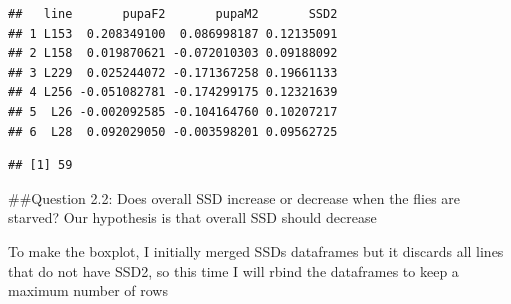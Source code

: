 \documentclass[
]{article}
\newenvironment{Shaded}{\begin{snugshade}}{\end{snugshade}}
\newcommand{\CommentTok}[1]{\textcolor[rgb]{0.56,0.35,0.01}{\textit{#1}}}
\newcommand{\DecValTok}[1]{\textcolor[rgb]{0.00,0.00,0.81}{#1}}
\newcommand{\KeywordTok}[1]{\textcolor[rgb]{0.13,0.29,0.53}{\textbf{#1}}}
\newcommand{\NormalTok}[1]{#1}
\newcommand{\OperatorTok}[1]{\textcolor[rgb]{0.81,0.36,0.00}{\textbf{#1}}}
\newcommand{\StringTok}[1]{\textcolor[rgb]{0.31,0.60,0.02}{#1}}
\begin{document}
\begin{verbatim}
##   line       pupaF2       pupaM2       SSD2
## 1 L153  0.208349100  0.086998187 0.12135091
## 2 L158  0.019870621 -0.072010303 0.09188092
## 3 L229  0.025244072 -0.171367258 0.19661133
## 4 L256 -0.051082781 -0.174299175 0.12321639
## 5  L26 -0.002092585 -0.104164760 0.10207217
## 6  L28  0.092029050 -0.003598201 0.09562725
\end{verbatim}

\begin{Shaded}
\end{Shaded}

\begin{verbatim}
## [1] 59
\end{verbatim}

\#\#Question 2.2: Does overall SSD increase or decrease when the flies
are starved? Our hypothesis is that overall SSD should decrease

To make the boxplot, I initially merged SSDs dataframes but it discards
all lines that do not have SSD2, so this time I will rbind the
dataframes to keep a maximum number of rows

\begin{Shaded}
\end{Shaded}
\end{document}
